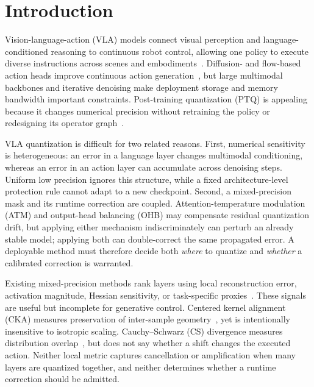 \section{Introduction}
\label{sec:introduction}

Vision-language-action (VLA) models connect visual perception and language-conditioned reasoning to continuous robot control, allowing one policy to execute diverse instructions across scenes and embodiments~\cite{brohan2023rt1,driess2023palme,brohan2023rt2,octo2024,kim2024openvla}. Diffusion- and flow-based action heads improve continuous action generation~\cite{chi2023diffusionpolicy,liu2025rdt1b,black2024pi0,intelligence2025pi05,bjorck2025groot}, but large multimodal backbones and iterative denoising make deployment storage and memory bandwidth important constraints. Post-training quantization (PTQ) is appealing because it changes numerical precision without retraining the policy or redesigning its operator graph~\cite{xiao2023smoothquant,lin2024duquant}.

VLA quantization is difficult for two related reasons. First, numerical sensitivity is heterogeneous: an error in a language layer changes multimodal conditioning, whereas an error in an action layer can accumulate across denoising steps. Uniform low precision ignores this structure, while a fixed architecture-level protection rule cannot adapt to a new checkpoint. Second, a mixed-precision mask and its runtime correction are coupled. Attention-temperature modulation (ATM) and output-head balancing (OHB) may compensate residual quantization drift, but applying either mechanism indiscriminately can perturb an already stable model; applying both can double-correct the same propagated error. A deployable method must therefore decide both \emph{where} to quantize and \emph{whether} a calibrated correction is warranted.

Existing mixed-precision methods rank layers using local reconstruction error, activation magnitude, Hessian sensitivity, or task-specific proxies~\cite{hubara2021accurate,frantar2022gptq,wang2019hawq,dong2020hawqv2,chen2024qdit,zhao2024mixdq}. These signals are useful but incomplete for generative control. Centered kernel alignment (CKA) measures preservation of inter-sample geometry~\cite{raghu2017svcca,morcos2018pwcca,kornblith2019similarity}, yet is intentionally insensitive to isotropic scaling. Cauchy--Schwarz (CS) divergence measures distribution overlap~\cite{yin2026csaligner}, but does not say whether a shift changes the executed action. Neither local metric captures cancellation or amplification when many layers are quantized together, and neither determines whether a runtime correction should be admitted.

